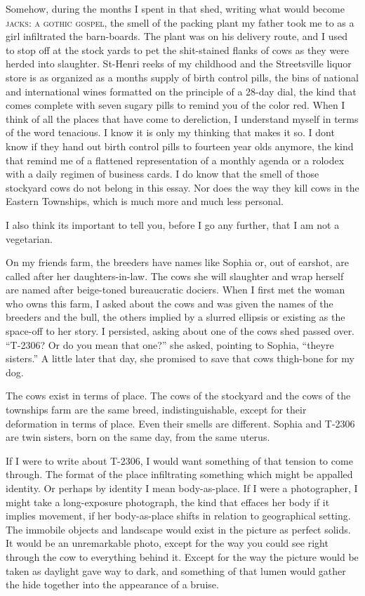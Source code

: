 \documentclass[
]{memoir}
\begin{document}
Somehow, during the months I spent in that shed, writing what would
become \textsc{jacks: a gothic gospel}, the smell of the packing plant
my father took me to as a girl infiltrated the barn-boards. The plant
was on his delivery route, and I used to stop off at the stock yards to
pet the shit-stained flanks of cows as they were herded into slaughter.
St-Henri reeks of my childhood and the Streetsville liquor store is as
organized as a months supply of birth control pills, the bins of
national and international wines formatted on the principle of a 28-day
dial, the kind that comes complete with seven sugary pills to remind you
of the color red. When I think of all the places that have come to
dereliction, I understand myself in terms of the word tenacious. I know
it is only my thinking that makes it so. I dont know if they hand out
birth control pills to fourteen year olds anymore, the kind that remind
me of a flattened representation of a monthly agenda or a rolodex with a
daily regimen of business cards. I do know that the smell of those
stockyard cows do not belong in this essay. Nor does the way they kill
cows in the Eastern Townships, which is much more and much less
personal.

I also think its important to tell you, before I go any further, that I
am not a vegetarian.

On my friends farm, the breeders have names like Sophia or, out of
earshot, are called after her daughters-in-law. The cows she will
slaughter and wrap herself are named after beige-toned bureaucratic
dociers. When I first met the woman who owns this farm, I asked about
the cows and was given the names of the breeders and the bull, the
others implied by a slurred ellipsis or existing as the space-off to her
story. I persisted, asking about one of the cows shed passed over.
``T-2306? Or do you mean that one?'' she asked, pointing to Sophia,
``theyre sisters.'' A little later that day, she promised to save that
cows thigh-bone for my dog.

The cows exist in terms of place. The cows of the stockyard and the cows
of the townships farm are the same breed, indistinguishable, except for
their deformation in terms of place. Even their smells are different.
Sophia and T-2306 are twin sisters, born on the same day, from the same
uterus.

If I were to write about T-2306, I would want something of that tension
to come through. The format of the place infiltrating something which
might be appalled identity. Or perhaps by identity I mean body-as-place.
If I were a photographer, I might take a long-exposure photograph, the
kind that effaces her body if it implies movement, if her body-as-place
shifts in relation to geographical setting. The immobile objects and
landscape would exist in the picture as perfect solids. It would be an
unremarkable photo, except for the way you could see right through the
cow to everything behind it. Except for the way the picture would be
taken as daylight gave way to dark, and something of that lumen would
gather the hide together into the appearance of a bruise.
\end{document}
